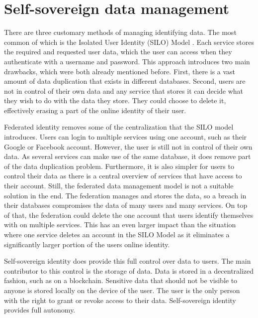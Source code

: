 \section{Self-sovereign data management}\label{solutions}
There are three customary methods of managing identifying data. The most common of which is the Isolated User Identity (SILO) Model \cite{federated}. Each service stores the required and requested user data, which the user can access when they authenticate with a username and password. This approach introduces two main drawbacks, which were both already mentioned before. First, there is a vast amount of data duplication that exists in different databases. Second, users are not in control of their own data and any service that stores it can decide what they wish to do with the data they store. They could choose to delete it, effectively erasing a part of the online identity of their user.

Federated identity removes some of the centralization that the SILO model introduces. Users can login to multiple services using one account, such as their Google or Facebook account. However, the user is still not in control of their own data. As several services can make use of the same database, it does remove part of the data duplication problem. Furthermore, it is also simpler for users to control their data as there is a central overview of services that have access to their account. Still, the federated data management model is not a suitable solution in the end. The federation manages and stores the data, so a breach in their databases compromises the data of many users and many services. On top of that, the federation could delete the one account that users identify themselves with on multiple services. This has an even larger impact than the situation where one service deletes an account in the SILO Model as it eliminates a significantly larger portion of the users online identity.

Self-sovereign identity does provide this full control over data to users. The main contributor to this control is the storage of data. Data is stored in a decentralized fashion, such as on a blockchain. Sensitive data that should not be visible to anyone is stored locally on the device of the user. The user is the only person with the right to grant or revoke access to their data. Self-sovereign identity provides full autonomy.

